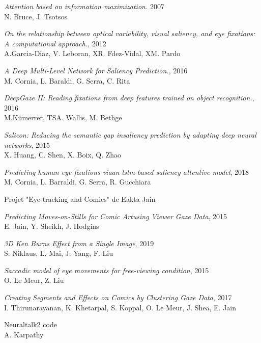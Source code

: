 \begin{thebibliography}{99}
    \emph{Attention based on information maximization.} 2007\\
    N. Bruce, J. Tsotsos

    \emph{On the relationship between optical variability, visual saliency, and eye fixations: A computational approach.}, 2012\\
    A.Garcia-Diaz, V. Leboran, XR. Fdez-Vidal, XM. Pardo

    \emph{A Deep Multi-Level Network for Saliency Prediction.}, 2016\\
    M. Cornia, L. Baraldi, G. Serra, C. Rita

  \emph{DeepGaze II: Reading fixations from deep features trained on object recognition.}, 2016\\
  M.Kümerrer, TSA. Wallis, M. Bethge

    \emph{Salicon: Reducing the semantic gap insaliency prediction by adapting deep neural networks}, 2015\\
    X. Huang, C. Shen, X. Boix, Q. Zhao

    \emph{Predicting human eye fixations viaan lstm-based saliency attentive model}, 2018\\
    M. Cornia, L. Barraldi, G. Serra, R. Gucchiara

    Projet "Eye-tracking and Comics" de Eakta Jain\\

    \emph{Predicting Moves-on-Stills for Comic Artusing Viewer Gaze Data}, 2015\\
    E. Jain, Y. Sheikh, J. Hodgins\\

    \emph{3D Ken Burns Effect from a Single Image}, 2019\\
    S. Niklaus, L. Mai, J. Yang, F. Liu\\

    \emph{Saccadic model of eye movements for free-viewing condition}, 2015\\
    O. Le Meur, Z. Liu\\

    \emph{Creating Segments and Effects on Comics by Clustering Gaze Data}, 2017\\
    I. Thirunarayanan, K. Khetarpal, S. Koppal, O. Le Meur, J. Shea, E. Jain\\

    Neuraltalk2 code\\
    A. Karpathy\\

\end{thebibliography}

